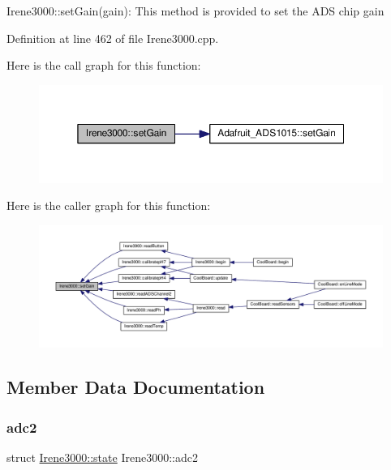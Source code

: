 Irene3000\+::set\+Gain(gain)\+: This method is provided to set the A\+DS chip gain 

Definition at line 462 of file Irene3000.\+cpp.

Here is the call graph for this function\+:\nopagebreak
\begin{figure}[H]
\begin{center}
\leavevmode
\includegraphics[width=350pt]{class_irene3000_aff7c5da186b388e7272e63ff88a20c34_cgraph}
\end{center}
\end{figure}
Here is the caller graph for this function\+:\nopagebreak
\begin{figure}[H]
\begin{center}
\leavevmode
\includegraphics[width=350pt]{class_irene3000_aff7c5da186b388e7272e63ff88a20c34_icgraph}
\end{center}
\end{figure}


\subsection{Member Data Documentation}
\mbox{\label{class_irene3000_aae3a95a1c83c766cd2f299ce471c337e}} 
\subsubsection{\texorpdfstring{adc2}{adc2}}
{\footnotesize\ttfamily struct \hyperlink{struct_irene3000_1_1state}{Irene3000\+::state} Irene3000\+::adc2\hspace{0.3cm}{\ttfamily [private]}}


